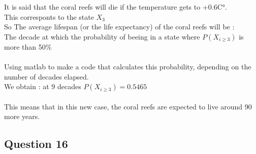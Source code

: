 \documentclass{article}
\begin{document}
    It is said that the coral reefs will die if the temperature gets to +0.6C°.
    \\This corresponts to the state $X_3$
    \\So The average lifespan (or the life expectancy) of the coral reefs will be :\\
    The decade at which the probability of beeing in a state where $P(X_{i\geq3})$ is more than 50\%\\
    \\
    Using matlab to make a code that calculates this probability, depending on the number of decades elapsed.\\
    We obtain : at 9 decades $P(X_{i\geq3}) = 0.5465$\\
    \\
    This means that in this new case, the coral reefs are expected to live around 90 more years.

    \subsection*{Question 16}
\end{document}

